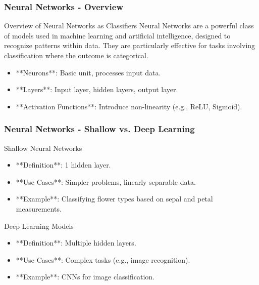 \documentclass{beamer}
\begin{document}
\begin{frame}
    \frametitle{Neural Networks - Overview}
    \begin{block}{Overview of Neural Networks as Classifiers}
        Neural Networks are a powerful class of models used in machine learning and artificial intelligence, designed to recognize patterns within data. They are particularly effective for tasks involving classification where the outcome is categorical.
    \end{block}
    
    \begin{itemize}
        \item **Neurons**: Basic unit, processes input data.
        \item **Layers**: Input layer, hidden layers, output layer.
        \item **Activation Functions**: Introduce non-linearity (e.g., ReLU, Sigmoid).
    \end{itemize}
\end{frame}

\begin{frame}
    \frametitle{Neural Networks - Shallow vs. Deep Learning}
    \begin{block}{Shallow Neural Networks}
        \begin{itemize}
            \item **Definition**: 1 hidden layer.
            \item **Use Cases**: Simpler problems, linearly separable data.
            \item **Example**: Classifying flower types based on sepal and petal measurements.
        \end{itemize}
    \end{block}

    \begin{block}{Deep Learning Models}
        \begin{itemize}
            \item **Definition**: Multiple hidden layers.
            \item **Use Cases**: Complex tasks (e.g., image recognition).
            \item **Example**: CNNs for image classification.
        \end{itemize}     
    \end{block}
\end{frame}
\end{document}
